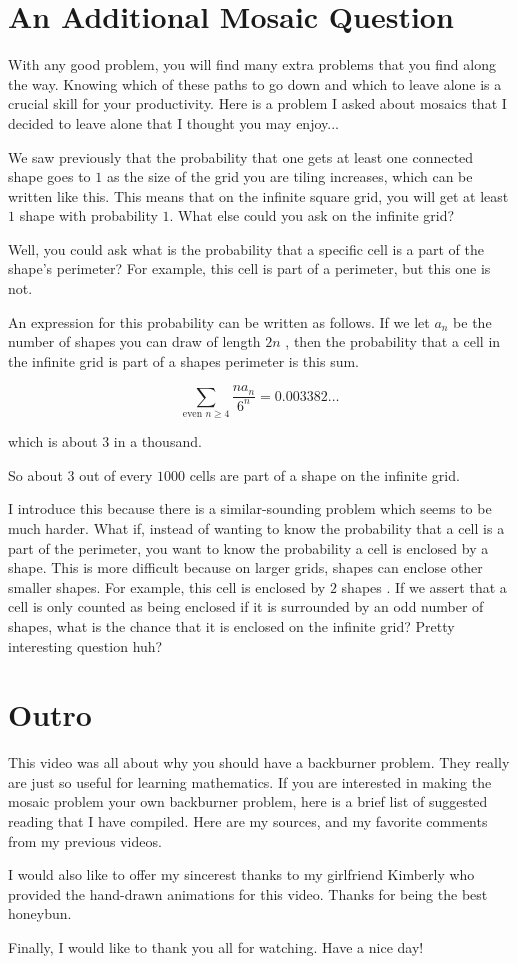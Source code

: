 \documentclass[12pt]{article}
\theoremstyle{plain}
\theoremstyle{definition}
\theoremstyle{remark}
\theoremstyle{definition}
\begin{document}
\section{An Additional Mosaic Question} %

With any good problem, you will find many extra problems that you find along the way. Knowing which of these paths to go down and which to leave alone is a crucial skill for your productivity. Here is a problem I asked about mosaics that I decided to leave alone that I thought you may enjoy...

We saw previously that the probability that one gets at least one connected shape goes to $1$ as the size of the grid you are tiling increases, which can be written like this. This means that on the infinite square grid, you will get at least $1$ shape with probability $1$. What else could you ask on the infinite grid? 

Well, you could ask what is the probability that a specific cell is a part of the shape's perimeter? For example, this cell is part of a perimeter, but this one is not.

An expression for this probability can be written as follows. If we let $a_{n}$ be the number of shapes you can draw of length $2n$ 
, then the probability that a cell in the infinite grid is part of a shapes perimeter is this sum.

$$\sum_{\text{even } n \geq 4} \frac{n a_{n}}{6^{n}} = 0.003382\dots$$

which is about $3$ in a thousand.

So about $3$ out of every $1000$ cells are part of a shape on the infinite grid.

I introduce this because there is a similar-sounding problem which seems to be much harder. What if, instead of wanting to know the probability that a cell is a part of the perimeter, you want to know the probability a cell is enclosed by a shape. This is more difficult because on larger grids, shapes can enclose other smaller shapes. For example, this cell is enclosed by $2$ shapes . If we assert that a cell is only counted as being enclosed if it is surrounded by an odd number of shapes, what is the chance that it is enclosed on the infinite grid? Pretty interesting question huh? 

\section{Outro}

This video was all about why you should have a backburner problem. They really are just so useful for learning mathematics. If you are interested in making the mosaic problem your own backburner problem, here is a brief list of suggested reading that I have compiled. Here are my sources, and my favorite comments from my previous videos.

I would also like to offer my sincerest thanks to my girlfriend Kimberly who provided the hand-drawn animations for this video. Thanks for being the best honeybun.

Finally, I would like to thank you all for watching. Have a nice day! 
\end{document}
